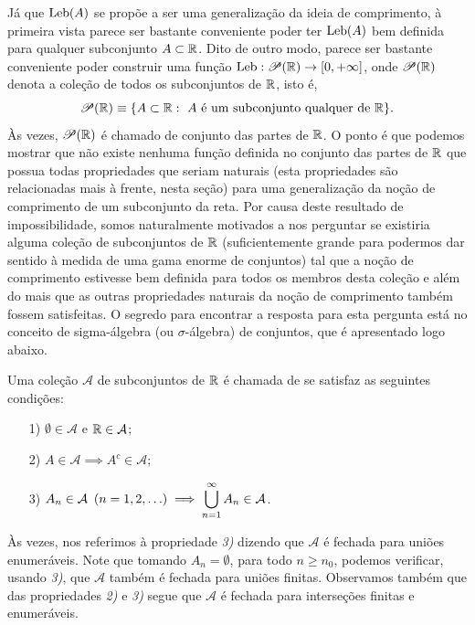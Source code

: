         Já que $\mathrm{Leb}(A)$ se propõe a ser uma generalização 
        da ideia de comprimento, à primeira vista parece ser bastante conveniente 
        poder ter $\mathrm{Leb}(A)$ bem definida para qualquer subconjunto $A\subset\mathbb{R}$.
        Dito de outro modo, parece ser bastante conveniente poder construir 
        uma função $\mathrm{Leb}:\mathscr{P}(\mathbb{R})\to [0,+\infty]$, 
        onde $\mathscr{P}(\mathbb{R})$ denota a coleção de todos os subconjuntos de $\mathbb{R}$,
        isto é, 
        \[
            \mathscr{P}(\mathbb{R})
            \equiv 
            \{A\subset\mathbb{R}:\ A\ \text{é um subconjunto qualquer de}\ \mathbb{R} \}.
        \]
        Às vezes, $\mathscr{P}(\mathbb{R})$ é chamado de conjunto das partes de $\mathbb{R}$.
        O ponto é que podemos mostrar que não existe nenhuma função definida 
        no conjunto das partes de $\mathbb{R}$ que possua todas propriedades que seriam 
        naturais (esta propriedades são relacionadas mais à frente,
        nesta seção) para uma generalização da noção de comprimento de um subconjunto da reta. 
        Por causa deste resultado  de impossibilidade, 
        somos naturalmente motivados a nos perguntar se existiria 
        alguma coleção de subconjuntos de $\mathbb{R}$ 
        (suficientemente grande para podermos dar sentido à medida de uma gama 
        enorme de conjuntos) 
        tal que a noção de comprimento estivesse 
        bem definida para todos os membros desta coleção e além do mais que as outras 
        propriedades naturais da noção de comprimento também fossem satisfeitas. 
        O segredo para encontrar a resposta para esta 
        pergunta está no conceito de sigma-álgebra 
        (ou $\sigma$-álgebra) de conjuntos, que é apresentado logo abaixo. 
        \begin{definicao}
        \label{def-sigma-algebra}
            Uma coleção $\mathcal{A}$ de subconjuntos de $\mathbb{R}$ é chamada de
             se satisfaz as seguintes condições:
            \begin{itemize}
            	\item[1)] $\emptyset\in\mathcal{A}$ e $\mathbb{R}\in\mathcal{A}$;
            	\item[2)] $A\in \mathcal{A} \implies A^c\in\mathcal{A}$;
            	\item[3)] $A_n\in\mathcal{A}\ \, (n=1,2,\ldots) 
            				\implies 
            				\displaystyle\bigcup_{n=1}^{\infty} A_n \in \mathcal{A}$.
            \end{itemize}
        \end{definicao}
        Às vezes, nos referimos à propriedade \textit{3)} dizendo que $\mathcal{A}$ é fechada 
        para uniões enumeráveis. Note que tomando $A_n=\emptyset$, para todo 
        $n\geqslant n_0$, podemos verificar, usando \textit{3)}, que $\mathcal{A}$ também é fechada 
        para uniões finitas. Observamos também que das propriedades \textit{2)} e \textit{3)} segue 
        que $\mathcal{A}$ é fechada para interseções finitas e enumeráveis.
    
